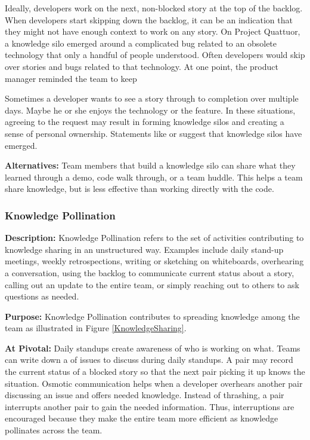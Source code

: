 Ideally, developers work on the next, non-blocked story at the top of the backlog. When developers start skipping down the backlog, it can be an indication that they might not have enough context to work on any story. On Project Quattuor, a knowledge silo emerged around a complicated bug related to an obsolete technology that only a handful of people understood. Often developers would skip over stories and bugs related to that technology. At one point, the product manager reminded the team to keep 

Sometimes a developer wants to see a story through to completion over multiple days. Maybe he or she enjoys the technology or the feature. In these situations, agreeing to the request may result in forming knowledge silos and creating a sense of personal ownership. Statements like  or  suggest that knowledge silos have emerged. 

\textbf{Alternatives:} Team members that build a knowledge silo can share what they learned through a demo, code walk through, or a team huddle. This helps a team share knowledge, but is less effective than working directly with the code. 

\subsubsection{Knowledge Pollination}
\textbf{Description:} Knowledge Pollination refers to the set of activities contributing to knowledge sharing in an unstructured way. Examples include daily stand-up meetings, weekly retrospections, writing or sketching on whiteboards, overhearing a conversation, using the backlog to communicate current status about a story, calling out an update to the entire team, or simply reaching out to others to ask questions as needed. 

\textbf{Purpose:} Knowledge Pollination contributes to spreading knowledge among the team as illustrated in Figure \ref{KnowledgeSharing}.

\textbf{At Pivotal:} Daily standups create awareness of who is working on what. Teams can write down a  of issues to discuss during daily standups. A pair may record the current status of a blocked story so that the next pair picking it up knows the situation. Osmotic communication helps when a developer overhears another pair discussing an issue and offers needed knowledge. Instead of thrashing, a pair interrupts another pair to gain the needed information. Thus, interruptions are encouraged because they make the entire team more efficient as knowledge pollinates across the team. 

